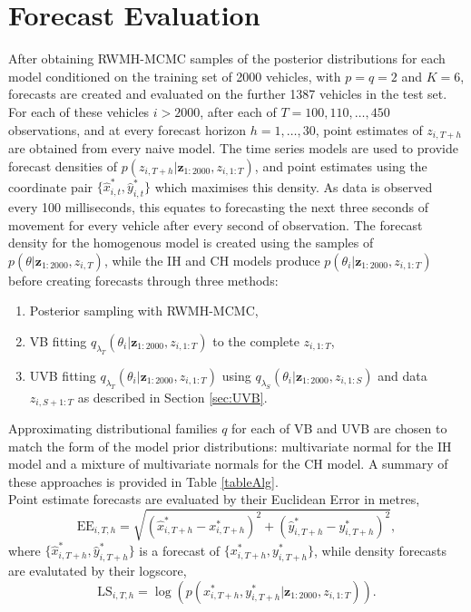 \documentclass[12pt,a4paper]{article}\usepackage[]{graphicx}\usepackage[]{color}
\begin{document}
\section{Forecast Evaluation}
\label{sec:eval}

After obtaining RWMH-MCMC samples of the posterior distributions for each model conditioned on the training set of 2000 vehicles, with $p = q = 2$ and $K = 6$, forecasts are created and evaluated on the  further 1387 vehicles in the test set. For each of these vehicles $i > 2000$, after each of $T = 100, 110, \dots, 450$ observations, and at every forecast horizon $h = 1, \dots, 30$, point estimates of $z_{i, T+h}$ are obtained from every naive model. The time series models are used to provide forecast densities of $p(z_{i, T+h} | \textbf{z}_{1:2000}, z_{i, 1:T})$, and point estimates using the coordinate pair $\{\hat{x}_{i, t}^*, \hat{y}_{i, t}^*\}$ which maximises this density. As data is observed every 100 milliseconds, this equates to forecasting the next three seconds of movement for every vehicle after every second of observation. The forecast density for the homogenous model is created using the samples of $p(\theta | \textbf{z}_{1:2000}, z_{i, T})$, while the IH and CH models produce $p(\theta_{i} | \textbf{z}_{1:2000}, z_{i, 1:T})$ before creating forecasts through three methods:
\begin{enumerate}
\item Posterior sampling with RWMH-MCMC,
\item VB fitting $q_{\lambda_T}(\theta_{i} | \textbf{z}_{1:2000}, z_{i, 1:T})$ to the complete $z_{i, 1:T}$,
\item UVB fitting $q_{\lambda_T}(\theta_{i} | \textbf{z}_{1:2000}, z_{i, 1:T})$ using $q_{\lambda_S}(\theta_{i} | \textbf{z}_{1:2000}, z_{i, 1:S})$ and data $z_{i, S+1:T}$ as described in Section \ref{sec:UVB}.
\end{enumerate}

Approximating distributional families $q$ for each of VB and UVB are chosen to match the form of the model prior distributions: multivariate normal for the IH model and a mixture of multivariate normals for the CH model. A summary of these approaches is provided in Table \ref{tableAlg}. 
\\

Point estimate forecasts are evaluated by their Euclidean Error in metres,
\begin{equation}
\mbox{EE}_{i, T, h} = \sqrt{\left(\hat{x}^*_{i, T+h} - x^*_{i, T+h} \right)^2 + \left(\hat{y}^*_{i, T+h} - y^*_{i, T+h} \right)^2},
\label{eucError}
\end{equation}
where $\{\hat{x}^*_{i, T+h}, \hat{y}^*_{i, T+h}\}$ is a forecast of $\{x^*_{i, T+h}, y^*_{i, T+h}\}$, while density forecasts are evalutated by their logscore,
\begin{equation}
\mbox{LS}_{i, T, h} = \log \left(p\left(x^*_{i, T+h}, y^*_{i, T+h} | \textbf{z}_{1:2000}, z_{i, 1:T} \right) \right).
\label{logscore}
\end{equation}
\end{document}

